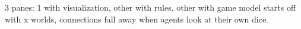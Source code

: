 3 panes: 1 with visualization, other with rules, other with game
model starts off with x worlds, connections fall away when agents look at their own dice.
